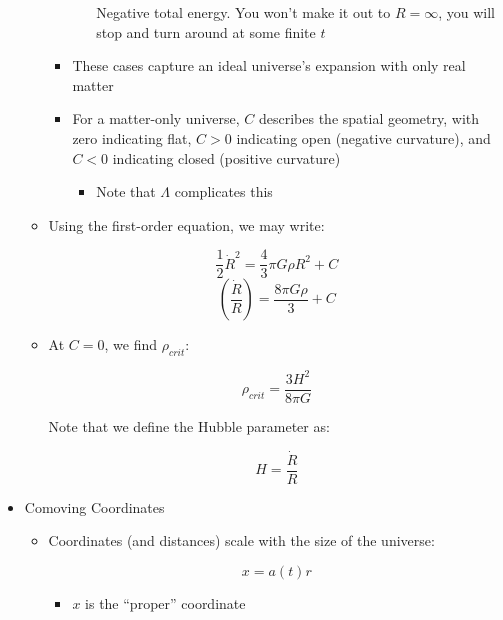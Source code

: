 \begin{itemize}
\begin{itemize}
\begin{itemize}
\begin{itemize}
                Negative total energy. You won't make it out to $R=\infty$, you will stop and turn around at some finite $t$
                
            \end{itemize}

          \item These cases capture an ideal universe's expansion with only real matter

          \item For a matter-only universe, $C$ describes the spatial geometry, with zero indicating flat, $C>0$ indicating open (negative curvature), and $C<0$ indicating closed (positive curvature)

            \begin{itemize}

              \item Note that $\Lambda$ complicates this

            \end{itemize}

        \end{itemize}

      \item Using the first-order equation, we may write:

        $$\frac{1}{2}\dot{R}^2=\frac{4}{3}\pi G\rho R^2+C$$
        $$\left(\frac{\dot{R}}{R}\right)=\frac{8\pi G\rho}{3}+C$$

      \item At $C=0$, we find $\rho_{crit}$:

        $$\rho_{crit}=\frac{3H^2}{8\pi G}$$

        Note that we define the Hubble parameter as:

        $$H=\frac{\dot{R}}{R}$$

    \end{itemize}

  \item Comoving Coordinates

    \begin{itemize}

      \item Coordinates (and distances) scale with the size of the universe:

        $$x=a(t)r$$

        \begin{itemize}

          \item $x$ is the ``proper'' coordinate


\end{itemize}
\end{itemize}
\end{itemize}
